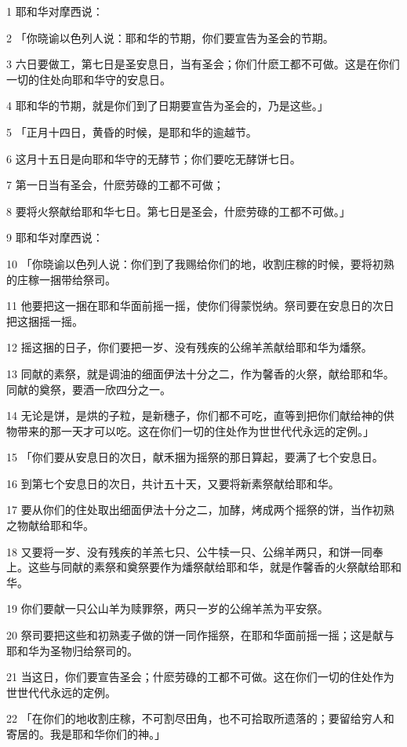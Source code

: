 \par 1 耶和华对摩西说：
\par 2 「你晓谕以色列人说：耶和华的节期，你们要宣告为圣会的节期。
\par 3 六日要做工，第七日是圣安息日，当有圣会；你们什麽工都不可做。这是在你们一切的住处向耶和华守的安息日。
\par 4 耶和华的节期，就是你们到了日期要宣告为圣会的，乃是这些。」
\par 5 「正月十四日，黄昏的时候，是耶和华的逾越节。
\par 6 这月十五日是向耶和华守的无酵节；你们要吃无酵饼七日。
\par 7 第一日当有圣会，什麽劳碌的工都不可做；
\par 8 要将火祭献给耶和华七日。第七日是圣会，什麽劳碌的工都不可做。」
\par 9 耶和华对摩西说：
\par 10 「你晓谕以色列人说：你们到了我赐给你们的地，收割庄稼的时候，要将初熟的庄稼一捆带给祭司。
\par 11 他要把这一捆在耶和华面前摇一摇，使你们得蒙悦纳。祭司要在安息日的次日把这捆摇一摇。
\par 12 摇这捆的日子，你们要把一岁、没有残疾的公绵羊羔献给耶和华为燔祭。
\par 13 同献的素祭，就是调油的细面伊法十分之二，作为馨香的火祭，献给耶和华。同献的奠祭，要酒一欣四分之一。
\par 14 无论是饼，是烘的子粒，是新穗子，你们都不可吃，直等到把你们献给神的供物带来的那一天才可以吃。这在你们一切的住处作为世世代代永远的定例。」
\par 15 「你们要从安息日的次日，献禾捆为摇祭的那日算起，要满了七个安息日。
\par 16 到第七个安息日的次日，共计五十天，又要将新素祭献给耶和华。
\par 17 要从你们的住处取出细面伊法十分之二，加酵，烤成两个摇祭的饼，当作初熟之物献给耶和华。
\par 18 又要将一岁、没有残疾的羊羔七只、公牛犊一只、公绵羊两只，和饼一同奉上。这些与同献的素祭和奠祭要作为燔祭献给耶和华，就是作馨香的火祭献给耶和华。
\par 19 你们要献一只公山羊为赎罪祭，两只一岁的公绵羊羔为平安祭。
\par 20 祭司要把这些和初熟麦子做的饼一同作摇祭，在耶和华面前摇一摇；这是献与耶和华为圣物归给祭司的。
\par 21 当这日，你们要宣告圣会；什麽劳碌的工都不可做。这在你们一切的住处作为世世代代永远的定例。
\par 22 「在你们的地收割庄稼，不可割尽田角，也不可拾取所遗落的；要留给穷人和寄居的。我是耶和华你们的神。」
